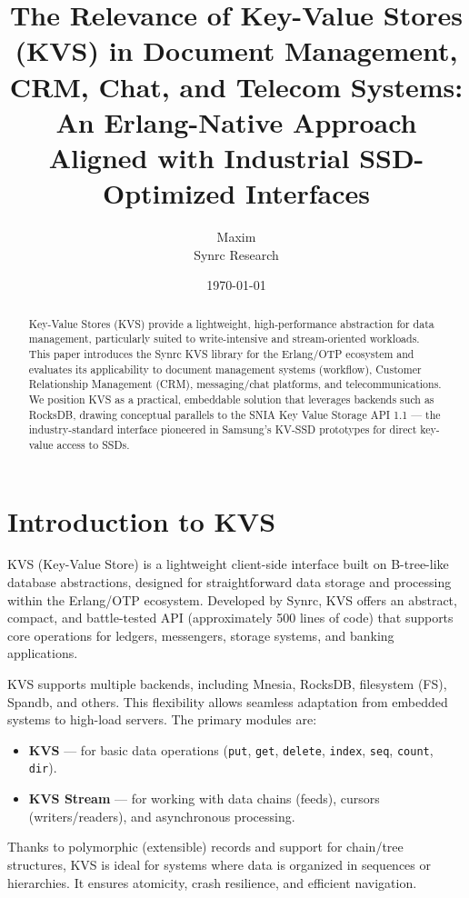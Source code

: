 \documentclass[11pt,a4paper]{article}
\title{The Relevance of Key-Value Stores (KVS) in Document Management, CRM, Chat, and Telecom Systems:\\ An Erlang-Native Approach Aligned with Industrial SSD-Optimized Interfaces}
\author{Maxim \\ Synrc Research}
\date{\today}
\begin{document}
\maketitle

\begin{abstract}
Key-Value Stores (KVS) provide a lightweight, high-performance abstraction for data management, particularly suited to write-intensive and stream-oriented workloads. This paper introduces the Synrc KVS library for the Erlang/OTP ecosystem and evaluates its applicability to document management systems (workflow), Customer Relationship Management (CRM), messaging/chat platforms, and telecommunications. We position KVS as a practical, embeddable solution that leverages backends such as RocksDB, drawing conceptual parallels to the SNIA Key Value Storage API 1.1 — the industry-standard interface pioneered in Samsung’s KV-SSD prototypes for direct key-value access to SSDs.
\end{abstract}

\section{Introduction to KVS}

KVS (Key-Value Store) is a lightweight client-side interface built on B-tree-like database abstractions, designed for straightforward data storage and processing within the Erlang/OTP ecosystem. Developed by Synrc, KVS offers an abstract, compact, and battle-tested API (approximately 500 lines of code) that supports core operations for ledgers, messengers, storage systems, and banking applications.

KVS supports multiple backends, including Mnesia, RocksDB, filesystem (FS), Spandb, and others. This flexibility allows seamless adaptation from embedded systems to high-load servers. The primary modules are:

\begin{itemize}
    \item \textbf{KVS} — for basic data operations (\texttt{put}, \texttt{get}, \texttt{delete}, \texttt{index}, \texttt{seq}, \texttt{count}, \texttt{dir}).
    \item \textbf{KVS Stream} — for working with data chains (feeds), cursors (writers/readers), and asynchronous processing.
\end{itemize}

Thanks to polymorphic (extensible) records and support for chain/tree structures, KVS is ideal for systems where data is organized in sequences or hierarchies. It ensures atomicity, crash resilience, and efficient navigation.
\end{document}
